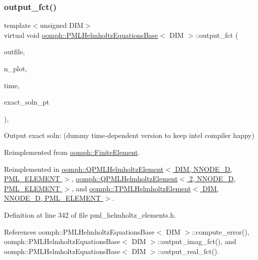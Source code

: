 \subsubsection{\texorpdfstring{output\+\_\+fct()}{output\_fct()}\hspace{0.1cm}{\footnotesize\ttfamily [2/2]}}
{\footnotesize\ttfamily template$<$unsigned D\+IM$>$ \\
virtual void \hyperlink{classoomph_1_1PMLHelmholtzEquationsBase}{oomph\+::\+P\+M\+L\+Helmholtz\+Equations\+Base}$<$ D\+IM $>$\+::output\+\_\+fct (\begin{DoxyParamCaption}\item[{std\+::ostream \&}]{outfile,  }\item[{const unsigned \&}]{n\+\_\+plot,  }\item[{const double \&}]{time,  }\item[{\hyperlink{classoomph_1_1FiniteElement_ad4ecf2b61b158a4b4d351a60d23c633e}{Finite\+Element\+::\+Unsteady\+Exact\+Solution\+Fct\+Pt}}]{exact\+\_\+soln\+\_\+pt }\end{DoxyParamCaption})\hspace{0.3cm}{\ttfamily [inline]}, {\ttfamily [virtual]}}



Output exact soln\+: (dummy time-\/dependent version to keep intel compiler happy) 



Reimplemented from \hyperlink{classoomph_1_1FiniteElement_a2a8426dccd57b927be0ae0eec00d0479}{oomph\+::\+Finite\+Element}.



Reimplemented in \hyperlink{classoomph_1_1QPMLHelmholtzElement_a3df73a2a3a9ad64f555719ecee3f7f40}{oomph\+::\+Q\+P\+M\+L\+Helmholtz\+Element$<$ D\+I\+M, N\+N\+O\+D\+E\+\_\+D, P\+M\+L\+\_\+\+E\+L\+E\+M\+E\+N\+T $>$}, \hyperlink{classoomph_1_1QPMLHelmholtzElement_a3df73a2a3a9ad64f555719ecee3f7f40}{oomph\+::\+Q\+P\+M\+L\+Helmholtz\+Element$<$ 2, N\+N\+O\+D\+E\+\_\+D, P\+M\+L\+\_\+\+E\+L\+E\+M\+E\+N\+T $>$}, and \hyperlink{classoomph_1_1TPMLHelmholtzElement_a6484704096ebd1938d584c8059f9ba7d}{oomph\+::\+T\+P\+M\+L\+Helmholtz\+Element$<$ D\+I\+M, N\+N\+O\+D\+E\+\_\+D, P\+M\+L\+\_\+\+E\+L\+E\+M\+E\+N\+T $>$}.



Definition at line 342 of file pml\+\_\+helmholtz\+\_\+elements.\+h.



References oomph\+::\+P\+M\+L\+Helmholtz\+Equations\+Base$<$ D\+I\+M $>$\+::compute\+\_\+error(), oomph\+::\+P\+M\+L\+Helmholtz\+Equations\+Base$<$ D\+I\+M $>$\+::output\+\_\+imag\+\_\+fct(), and oomph\+::\+P\+M\+L\+Helmholtz\+Equations\+Base$<$ D\+I\+M $>$\+::output\+\_\+real\+\_\+fct().

